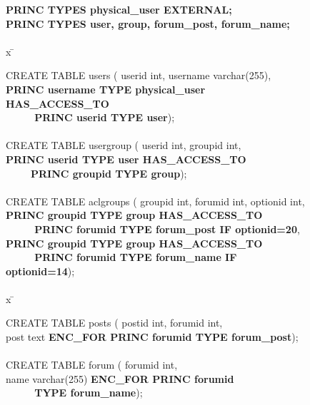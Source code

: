 \renewcommand{\FrameSep}{0.05in}
\begin{figure}[t!]
\begin{framed}
\footnotesize

\begin{tabbing}

{\bf PRINC TYPES physical\_user EXTERNAL;} \\
{\bf PRINC TYPES user, group, forum\_post, forum\_name;}\\

\\

x \= \kill

CREATE TABLE users ( userid int, username varchar(255),\\

\> {\bf PRINC username TYPE physical\_user HAS\_ACCESS\_TO } \\
\> {\bf ~ ~ ~ PRINC userid TYPE user});\\

\\

CREATE TABLE usergroup ( userid int, groupid int,\\

\> {\bf PRINC userid TYPE user HAS\_ACCESS\_TO } \\
\> {~ ~ ~ \bf PRINC groupid TYPE group});\\

\\

CREATE TABLE aclgroups ( groupid int, forumid int, optionid int, \\

\> {\bf PRINC groupid TYPE group HAS\_ACCESS\_TO }\\
\> {\bf ~ ~ ~ PRINC forumid TYPE forum\_post IF optionid=20}, \\
\> {\bf PRINC groupid TYPE group HAS\_ACCESS\_TO }\\
\> {\bf ~ ~ ~ PRINC forumid TYPE forum\_name IF optionid=14}); \\

\\
x \= \kill


CREATE TABLE posts ( postid int, forumid int,\\
\> post text {\bf ENC\_FOR PRINC forumid TYPE forum\_post});\\
\\
CREATE TABLE forum ( forumid int,\\
\> name varchar(255) {\bf ENC\_FOR PRINC forumid } \\
\> {\bf ~ ~ ~ TYPE forum\_name});


\end{tabbing}
\end{framed}
\end{figure}

